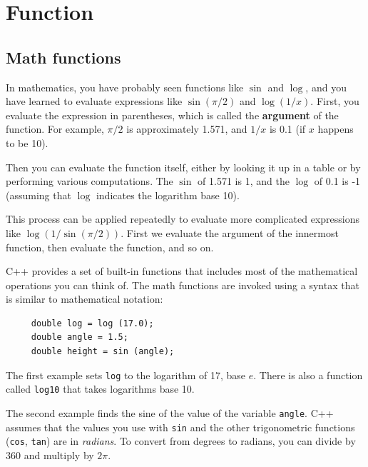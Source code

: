 


\chapter{Function}

\section{Math functions}
\label{mathlibrary}

In mathematics, you have probably seen functions like $\sin$ and
$\log$, and you have learned to evaluate expressions like
$\sin(\pi/2)$ and $\log(1/x)$.  First, you evaluate the
expression in parentheses, which is called the {\bf argument} of the
function.  For example, $\pi/2$ is approximately 1.571, and $1/x$ is
0.1 (if $x$ happens to be 10).

Then you can evaluate the function itself, either by looking it up in
a table or by performing various computations.  The $\sin$ of 1.571 is
1, and the $\log$ of 0.1 is -1 (assuming that $\log$ indicates the
logarithm base 10).

This process can be applied repeatedly to evaluate more complicated
expressions like $\log(1/\sin(\pi/2))$.  First we evaluate the
argument of the innermost function, then evaluate the function,
and so on.

C++ provides a set of built-in functions that includes most
of the mathematical operations you can think of.
The math functions are invoked using a syntax that is similar to
mathematical notation:

\begin{verbatim}
     double log = log (17.0);
     double angle = 1.5;
     double height = sin (angle);
\end{verbatim}
%
The first example sets {\tt log} to the logarithm of 17, base
$e$.  There is also a function called {\tt log10} that takes
logarithms base 10.

The second example finds the sine of the value of the variable
{\tt angle}.  C++ assumes that the
values you use with {\tt sin} and the other trigonometric functions
({\tt cos}, {\tt tan}) are in {\em radians}.  To
convert from degrees to radians, you can divide by 360
and multiply by $2 \pi$.  

